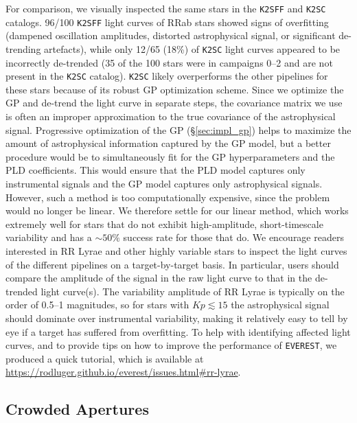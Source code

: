 \documentclass[]{aastex62}
\newcommand{\edited}[1]{{\color{red} #1}}
\begin{document}
For comparison, we visually inspected the same stars in the \texttt{K2SFF} and \texttt{K2SC}
catalogs. 96/100 \texttt{K2SFF} light curves of RRab stars showed signs of overfitting
(dampened oscillation amplitudes, distorted astrophysical signal,
or significant de-trending artefacts), while only 12/65 (18\%) of \texttt{K2SC} light curves
appeared to be incorrectly de-trended (35 of the 100 stars were in campaigns 0--2 and are
not present in the \texttt{K2SC} catalog). \texttt{K2SC} likely overperforms the other
pipelines for these stars because of its robust GP optimization scheme. Since we optimize
the GP and de-trend the light curve in separate steps, the covariance matrix we use is often
an improper approximation to the true covariance of the astrophysical signal. Progressive
optimization of the GP (\S\ref{sec:impl_gp}) helps to maximize the amount of astrophysical
information captured by the GP model, but a better procedure would be to simultaneously
fit for the GP hyperparameters and the PLD coefficients. This would ensure that the PLD
model captures only instrumental signals and the GP model captures only astrophysical
signals. However, such a method is \edited{too computationally expensive}, since the problem would
no longer be linear. We therefore settle for our linear method, which works extremely
well for stars that do not exhibit \edited{high-amplitude, short-timescale} variability and has a ${\sim}50\%$ success
rate for those that do. We encourage readers interested in RR Lyrae and other
\edited{highly variable} stars to inspect the light curves of the different
pipelines on a target-by-target basis. \edited{In particular, users should compare
the amplitude of the signal in the raw light curve to that in the de-trended light curve(s).
The variability amplitude of RR Lyrae is typically on the order of 0.5--1 magnitudes, so for
stars with $Kp \lesssim 15$ the astrophysical signal should dominate over instrumental
variability, making it relatively easy to tell by eye if a target has suffered from
overfitting. To help with identifying affected light curves, and to provide tips on how
to improve the performance of \texttt{EVEREST}, we produced a quick tutorial, which is available at
\url{https://rodluger.github.io/everest/issues.html\#rr-lyrae}.}

\subsection{Crowded Apertures}
\label{sec:crowded}
\end{document}
